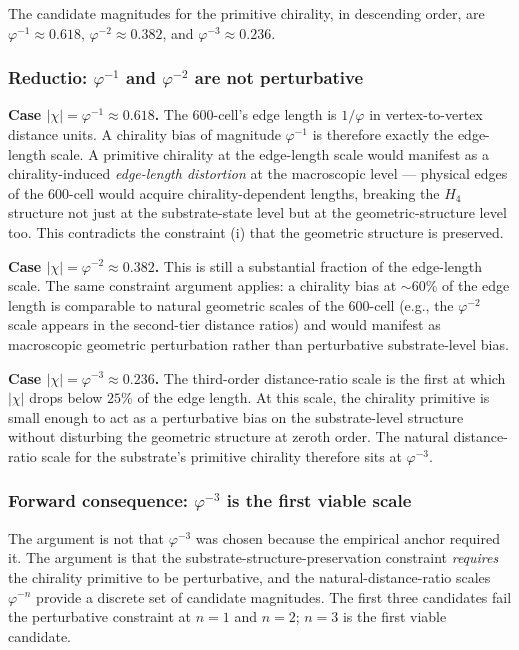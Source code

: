\documentclass[11pt,letterpaper]{article}
\newcommand{\phig}{\varphi}
\newcommand{\Hfour}{H_4}
\begin{document}
The candidate magnitudes for the primitive chirality, in descending order, are $\phig^{-1} \approx 0.618$, $\phig^{-2} \approx 0.382$, and $\phig^{-3} \approx 0.236$.

\subsubsection{Reductio: $\phig^{-1}$ and $\phig^{-2}$ are not perturbative}\label{sec:chi_reductio}

\textbf{Case $|\chi| = \phig^{-1} \approx 0.618$.} The 600-cell's edge length is $1/\phig$ in vertex-to-vertex distance units. A chirality bias of magnitude $\phig^{-1}$ is therefore exactly the edge-length scale. A primitive chirality at the edge-length scale would manifest as a chirality-induced \emph{edge-length distortion} at the macroscopic level --- physical edges of the 600-cell would acquire chirality-dependent lengths, breaking the $\Hfour$ structure not just at the substrate-state level but at the geometric-structure level too. This contradicts the constraint (i) that the geometric structure is preserved.

\textbf{Case $|\chi| = \phig^{-2} \approx 0.382$.} This is still a substantial fraction of the edge-length scale. The same constraint argument applies: a chirality bias at $\sim 60\%$ of the edge length is comparable to natural geometric scales of the 600-cell (e.g., the $\phig^{-2}$ scale appears in the second-tier distance ratios) and would manifest as macroscopic geometric perturbation rather than perturbative substrate-level bias.

\textbf{Case $|\chi| = \phig^{-3} \approx 0.236$.} The third-order distance-ratio scale is the first at which $|\chi|$ drops below $25\%$ of the edge length. At this scale, the chirality primitive is small enough to act as a perturbative bias on the substrate-level structure without disturbing the geometric structure at zeroth order. The natural distance-ratio scale for the substrate's primitive chirality therefore sits at $\phig^{-3}$.

\subsubsection{Forward consequence: $\phig^{-3}$ is the first viable scale}\label{sec:chi_forward}

The argument is not that $\phig^{-3}$ was chosen because the empirical anchor required it. The argument is that the substrate-structure-preservation constraint \emph{requires} the chirality primitive to be perturbative, and the natural-distance-ratio scales $\phig^{-n}$ provide a discrete set of candidate magnitudes. The first three candidates fail the perturbative constraint at $n = 1$ and $n = 2$; $n = 3$ is the first viable candidate.
\end{document}
